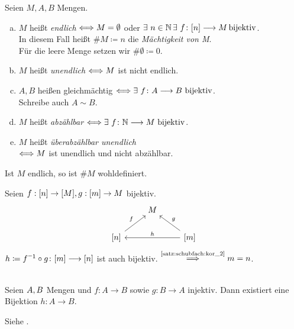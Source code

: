 \documentclass[../ana1.tex]{subfiles}
\begin{document}
\begin{defi}
	Seien \(M, A, B \) Mengen.
	\begin{enumerate}[(a)]
		\item \(M \) heißt \textit{endlich} 
		\(\mathrel{\Longleftrightarrow} M = \emptyset \) oder 
		\(\exists \, n \in \N \, \exists \, 
		f \colon [n] \longrightarrow M \bijektiv \). \\
			  In diesem Fall heißt \( \# M \coloneqq n \) die \textit{Mächtigkeit von M}. \\
			  Für die leere Menge setzen wir \( \# \emptyset \coloneqq 0 \).
		\item \(M \) heißt \textit{unendlich} \(\mathrel{\Longleftrightarrow} M \) ist nicht endlich.
		\item \(A, B \) heißen gleichmächtig \(\longeq \exists \, f \colon A \longrightarrow B \, \bijektiv \). \\
			  Schreibe auch \(A \sim B\).
		\item \(M \) heißt \textit{abzählbar} \(\longeq \exists \, f \colon \N \longrightarrow M \, \bijektiv \).
		\item \(M \) heißt \textit{überabzählbar unendlich}\\
		\(\mathrel{\Longleftrightarrow} M \) ist unendlich und nicht abzählbar.
	\end{enumerate}
\end{defi}

\begin{bem}
	Ist \(M \) endlich, so ist \( \# M \) wohldefiniert.
\end{bem}
\begin{bew}
	Seien \( f:[n]\rightarrow [M], g:[m]\rightarrow M \) bijektiv.
	\[\begin{tikzcd}
		& M &  \\
	   {[n]} \arrow[ru, "f"] &  & {[m]} \arrow[lu, "g"'] \arrow[ll, "h"']
	\end{tikzcd}\]
	\( h \coloneqq \inverse{f} \circ g \colon [m] \longrightarrow [n] \) ist auch bijektiv. \(\oversett{\autoref{satz:schubfach:kor_2}}{\implies} m=n \).
\end{bew}

\iftoggle{short}{}{\newpage}%

\begin{bem}\label{satz:cantor_Berenstein}\leavevmode \\
	Seien \(A , B \) Mengen und \(f \colon A \longrightarrow B \) sowie \(g \colon B \longrightarrow A \) injektiv.
	Dann existiert eine Bijektion \(h \colon A \longrightarrow B \).
\end{bem}
\begin{bew}
	Siehe \cite[Kolmogorov-Fomin: Introductory Real Analysis]{Kolmogorov}.
\end{bew}
\end{document}
